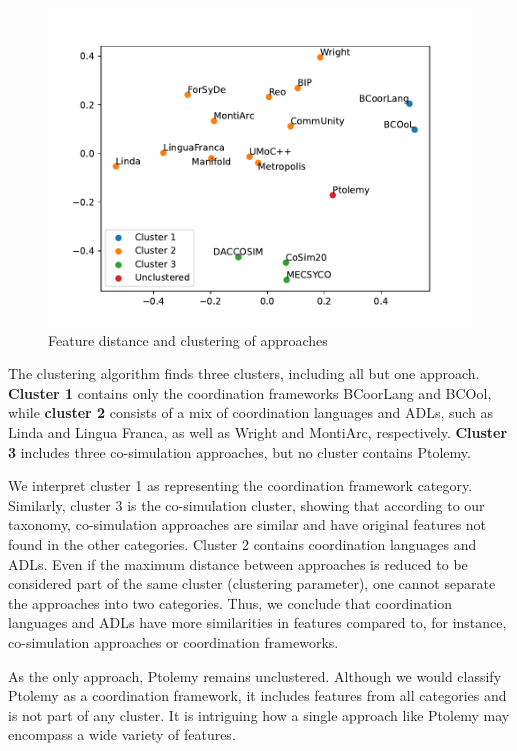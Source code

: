 \documentclass[runningheads]{llncs}
\begin{document}
\begin{figure}[ht]
	\centering
	\includegraphics[width=1\textwidth]{images/approach_scatter}
	\caption{Feature distance and clustering of approaches}
	\label{fig: clusters}
\end{figure}

The clustering algorithm finds three clusters, including all but one approach.
\textbf{Cluster 1} contains only the coordination frameworks BCoorLang and BCOol, 
while \textbf{cluster 2} consists of a mix of coordination languages and ADLs, such as Linda and Lingua Franca, as well as Wright and MontiArc, respectively.
\textbf{Cluster 3} includes three co-simulation approaches, but no cluster contains Ptolemy.

We interpret cluster 1 as representing the coordination framework category.
Similarly, cluster 3 is the co-simulation cluster, showing that according to our taxonomy, co-simulation approaches are similar and have original features not found in the other categories.
Cluster 2 contains coordination languages and ADLs.
Even if the maximum distance between approaches is reduced to be considered part of the same cluster (clustering parameter), one cannot separate the approaches into two categories.
Thus, we conclude that coordination languages and ADLs have more similarities in features compared to, for instance, co-simulation approaches or coordination frameworks.

As the only approach, Ptolemy remains unclustered. 
Although we would classify Ptolemy as a coordination framework, it includes features from all categories and is not part of any cluster.
It is intriguing how a single approach like Ptolemy may encompass a wide variety of features.
\end{document}
